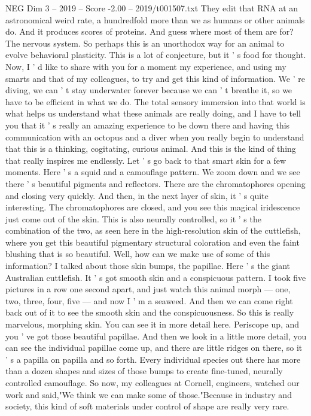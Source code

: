 \begin{textsample}{NEG Dim 3 – 2019 – Score -2.00 – 2019/t001507.txt}
They edit that RNA at an astronomical weird rate, a hundredfold more than we as humans or other animals do.
And it produces scores of proteins.
And guess where most of them are for?
The nervous system.
So perhaps this is an unorthodox way for an animal to evolve behavioral plasticity.
This is a lot of conjecture, but it ' s food for thought.
Now, I ' d like to share with you for a moment my experience, and using my smarts and that of my colleagues, to try and get this kind of information.
We ' re diving, we can ' t stay underwater forever because we can ' t breathe it, so we have to be efficient in what we do.
The total sensory immersion into that world is what helps us understand what these animals are really doing, and I have to tell you that it ' s really an amazing experience to be down there and having this communication with an octopus and a diver when you really begin to understand that this is a thinking, cogitating, curious animal.
And this is the kind of thing that really inspires me endlessly.
Let ' s go back to that smart skin for a few moments.
Here ' s a squid and a camouflage pattern.
We zoom down and we see there ' s beautiful pigments and reflectors.
There are the chromatophores opening and closing very quickly.
And then, in the next layer of skin, it ' s quite interesting.
The chromatophores are closed, and you see this magical iridescence just come out of the skin.
This is also neurally controlled, so it ' s the combination of the two, as seen here in the high-resolution skin of the cuttlefish, where you get this beautiful pigmentary structural coloration and even the faint blushing that is so beautiful.
Well, how can we make use of some of this information?
I talked about those skin bumps, the papillae.
Here ' s the giant Australian cuttlefish.
It ' s got smooth skin and a conspicuous pattern.
I took five pictures in a row one second apart, and just watch this animal morph — one, two, three, four, five — and now I ' m a seaweed.
And then we can come right back out of it to see the smooth skin and the conspicuousness.
So this is really marvelous, morphing skin.
You can see it in more detail here.
Periscope up, and you ' ve got those beautiful papillae.
And then we look in a little more detail, you can see the individual papillae come up, and there are little ridges on there, so it ' s a papilla on papilla and so forth.
Every individual species out there has more than a dozen shapes and sizes of those bumps to create fine-tuned, neurally controlled camouflage.
So now, my colleagues at Cornell, engineers, watched our work and said,"We think we can make some of those."Because in industry and society, this kind of soft materials under control of shape are really very rare.

\end{textsample}
